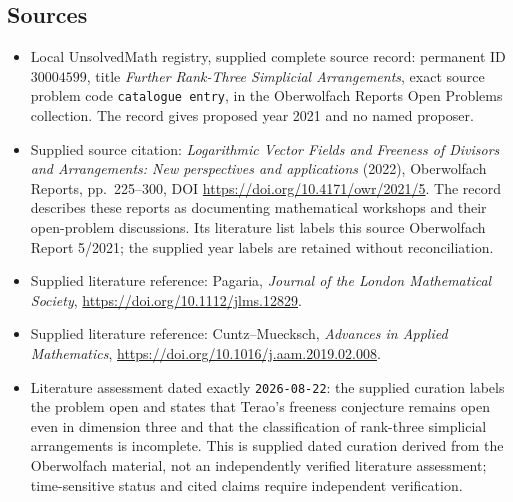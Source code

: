 \documentclass[11pt]{article}
\begin{document}
\subsection{Sources}
\begin{itemize}
\item Local UnsolvedMath registry, supplied complete source record: permanent ID \(30004599\), title \emph{Further Rank-Three Simplicial Arrangements}, exact source problem code \texttt{catalogue entry}, in the Oberwolfach Reports Open Problems collection. The record gives proposed year 2021 and no named proposer.
\item Supplied source citation: \emph{Logarithmic Vector Fields and Freeness of Divisors and Arrangements: New perspectives and applications} (2022), Oberwolfach Reports, pp.\ 225--300, DOI \url{https://doi.org/10.4171/owr/2021/5}. The record describes these reports as documenting mathematical workshops and their open-problem discussions. Its literature list labels this source Oberwolfach Report 5/2021; the supplied year labels are retained without reconciliation.
\item Supplied literature reference: Pagaria, \emph{Journal of the London Mathematical Society}, \url{https://doi.org/10.1112/jlms.12829}.
\item Supplied literature reference: Cuntz--Muecksch, \emph{Advances in Applied Mathematics}, \url{https://doi.org/10.1016/j.aam.2019.02.008}.
\item Literature assessment dated exactly \texttt{2026-08-22}: the supplied curation labels the problem open and states that Terao's freeness conjecture remains open even in dimension three and that the classification of rank-three simplicial arrangements is incomplete. This is supplied dated curation derived from the Oberwolfach material, not an independently verified literature assessment; time-sensitive status and cited claims require independent verification.
\end{itemize}
\end{document}
